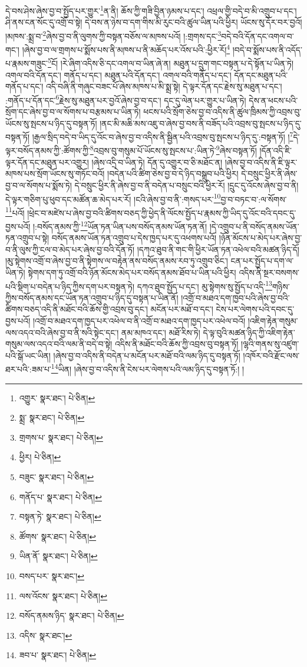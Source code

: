 དེ་བས་ཤེས་ཞེས་བྱ་བ་སྤྱོད་པར་གྱུར་\footnote{འགྱུར་  སྣར་ཐང་།  པེ་ཅིན། }ན་ནི། ཆོས་ཀྱི་གཟི་བྱིན་ཉམས་པ་དང་། འཕྲལ་གྱི་བདེ་བ་མི་འགྲུབ་པ་དང་། ཤི་ནས་ངན་སོང་དུ་འགྲོ་བ་སྟེ། དེ་བས་ན་ཉེས་བ་དག་གིས་མི་རུང་བའི་ཚུལ་ཡིན་པའི་ཕྱིར། ཡོངས་སུ་དོར་བར་བྱའོ། །མཁས་:སྨྲ་བ་\footnote{སྨྲ་  སྣར་ཐང་།  པེ་ཅིན། }ཞེས་བྱ་བ་ནི་ལུགས་ཀྱི་བསྟན་བཅོས་ལ་མཁས་པའོ། །:གྲགས་དང་\footnote{གྲགས་པ་  སྣར་ཐང་།  པེ་ཅིན། }བདེ་བའི་དོན་དང་འགལ་བ་གང་། །ཞེས་བྱ་བ་ལ་གྲགས་པ་སྨོས་པས་ནི་མཁས་པ་ནི་མཆོད་པར་འོས་པའི་:ཕྱིར་རོ།\footnote{ཕྱིར།  པེ་ཅིན། } །བདེ་བ་སྨོས་པས་ནི་འདོད་པ་རྣམས་གཟུང་\footnote{བཟུང་  སྣར་ཐང་།  པེ་ཅིན། }ངོ། །རེ་ཞིག་འདིས་ཅི་དང་འགལ་བ་ཡིན་ཞེ་ན། མཐུན་པ་དྲུག་གང་བསྟན་པ་དེ་སྟོན་པ་ཡིན་ཏེ། འགལ་བའི་དོན་དང་། གནོད་པ་དང་། མཐུན་པའི་དོན་དང་། འགལ་བའི་གནོད་པ་དང་། དོན་དང་མཐུན་པའི་གནོད་པ་དང་། འདི་བཞི་ནི་གཞུང་བཟང་པོ་ཞེས་མཁས་པ་མི་སྨྲ་སྟེ། དེ་ལྟར་དོན་དང་རྗེས་སུ་མཐུན་པ་དང་། :གནོད་པ་དོན་དང་\footnote{གནོད་པ་  སྣར་ཐང་།  པེ་ཅིན། }རྗེས་སུ་མཐུན་པར་བྱའོ་ཞེས་བྱ་བ་དང་། དང་དུ་ལེན་པར་གྱུར་པ་ཡིན་ཏེ། དེས་ན་ཕངས་པའི་སྲོག་དང་ཞེས་བྱ་བ་ལ་སོགས་པ་བརྩམས་པ་ཡིན་ཏེ། ཕངས་པའི་སྲོག་ཅེས་བྱ་བ་འདིས་ནི་ཚུལ་ཁྲིམས་ཀྱི་འབྲས་བུ་ཡོངས་སུ་སྤངས་པ་ཉིད་དུ་བསྟན་ཏོ། །ནང་མི་མཆི་མས་འཇུ་བ་ཞེས་བྱ་བས་ནི་བཟོད་པའི་འབྲས་བུ་སྤངས་པ་ཉིད་དུ་བསྟན་ཏོ། །རྒྱལ་སྲིད་བདེ་བ་ཡིད་དུ་འོང་བ་ཞེས་བྱ་བ་འདིས་ནི་སྦྱིན་པའི་འབྲས་བུ་སྤངས་པ་ཉིད་དུ་:བསྟན་ཏོ། །\footnote{བསྟན་ཏེ་  སྣར་ཐང་།  པེ་ཅིན། }དེ་ལྟར་བསོད་ནམས་ཀྱི་:ཚོགས་ཀྱི་\footnote{ཚོགས་  སྣར་ཐང་།  པེ་ཅིན། }འབྲས་བུ་གསུམ་པོ་ཡོངས་སུ་སྤངས་པ་:ཡིན་ཏེ་\footnote{ཡིན་ནོ་  སྣར་ཐང་།  པེ་ཅིན། }ཞེས་བསྟན་ཏོ། །དོན་འདི་ཇི་ལྟར་དོན་དང་མཐུན་པར་འགྱུར། །ཞེས་འདྲི་བ་ཡིན་ཏེ། དོན་དུ་འགྱུར་བ་ཅི་མཐོང་ན། །ཞེས་བྱ་བ་འདིས་ནི་ཇི་ལྟར་མཁས་པས་སྲོག་ཡོངས་སུ་གཏོང་བའོ། །བདེན་པའི་ཚིག་ཅེས་བྱ་བ་དེ་ཉིད་བསྒྲུབ་པའི་ཕྱིར། དེ་བསྲུང་ཕྱིར་ནི་ཞེས་བྱ་བ་ལ་སོགས་པ་སྨོས་ཏེ། དེ་བསྲུང་ཕྱིར་ནི་ཞེས་བྱ་བ་ནི་བདེན་པ་བསྲུང་བའི་ཕྱིར་རོ། །དྲུང་དུ་འོངས་ཞེས་བྱ་བ་ནི། དེ་ལྟར་གཅིག་པུ་ཕུབ་དང་མཚོན་ཆ་མེད་པར་རོ། །ངའི་ཞེས་བྱ་བ་ནི་:གསད་པར་\footnote{བསད་པར་  སྣར་ཐང་། }བྱ་བ་བཏང་བ་:ལ་སོགས་\footnote{ལས་འོངས་  སྣར་ཐང་།  པེ་ཅིན། }པའོ། །ཕྲེང་བ་མཛེས་པ་ཞེས་བྱ་བའི་ཚིགས་བཅད་ཀྱི་ཕྱེད་ནི་ལོངས་སྤྱོད་པ་རྣམས་ཀྱི་ཡིད་དུ་འོང་བའི་དབང་དུ་བྱས་པའོ། །:བསོད་ནམས་ཀྱི་\footnote{བསོད་ནམས་ཉིད་  སྣར་ཐང་།  པེ་ཅིན། }ཡོན་ཏན་ཡིན་པས་བསོད་ནམས་ཡོན་ཏན་ནོ། །དེ་འགྲུབ་པ་ནི་བསོད་ནམས་ཡོན་ཏན་འགྲུབ་པ་སྟེ། བསོད་ནམས་ཡོན་ཏན་འགྲུབ་པ་དེས་ཁྱད་པར་དུ་འཕགས་པའོ། །ཉོན་མོངས་པ་མེད་པར་ཞེས་བྱ་བ་ནི་ལུས་ཀྱི་ངལ་བ་མེད་པར་ཞེས་བྱ་བའི་དོན་ཏོ། །དཀའ་ཐུབ་ནི་གང་གི་ཕྱིར་ཡོན་ཏན་འཕེལ་བའི་མཚན་ཉིད་དོ། །མུ་སྟེགས་འགྲོ་བ་ཞེས་བྱ་བ་ནི་སྟེགས་ལ་བརྟེན་ནས་བསོད་ནམས་རབ་ཏུ་འགྲུབ་ཅིང་། ངན་པར་སྤྱོད་པ་དག་ལ་ཡིན་ཏེ། སྟེགས་དག་ཏུ་འགྲོ་བའི་ཉོན་མོངས་མེད་པར་བསོད་ནམས་ཐོབ་པ་ཡིན་པའི་ཕྱིར། འདིས་ནི་སྔར་བསགས་པའི་སྡིག་པ་བདེན་པ་ཉིད་ཀྱིས་དག་པར་བསྟན་ཏེ། དཀའ་ཐུབ་སྤྱོད་པ་དང་། མུ་སྟེགས་སུ་སྤྱོད་པ་འདི་\footnote{འདིས་  སྣར་ཐང་། }གཉིས་ཀྱིས་བསོད་ནམས་དང་ཡོན་ཏན་འགྲུབ་པ་ཉིད་དུ་བསྟན་པ་ཡིན་ནོ། །འགྲོ་བ་མཐའ་དག་ཁྱབ་པའི་ཞེས་བྱ་བའི་ཚིགས་བཅད་འདི་ནི་མཐོང་བའི་ཆོས་གྱི་འབྲས་བུ་དང་། མངོན་པར་མཐོ་བ་དང་། ངེས་པར་ལེགས་པའི་དབང་དུ་བྱས་པའོ། །འགྲོ་བ་མཐའ་དག་ཁྱད་པར་འཕེལ་བ་ནི་འགྲོ་བ་མཐའ་དག་ཁྱད་པར་འཕེལ་བའོ། །འཇིག་རྟེན་གསུམ་ལས་འདའ་བའི་ཞེས་བྱ་བ་ནི་སའི་སྟེང་དང་། ནམ་མཁའ་དང་། མཐོ་རིས་ཏེ། དེ་ལྟ་བུའི་མཚན་ཉིད་ཀྱི་འཇིག་རྟེན་གསུམ་ལས་འདའ་བའི་ལམ་ནི་བདེ་བ་སྟེ། འདིས་ནི་མཐོང་བའི་ཆོས་ཀྱི་འབྲས་བུ་བསྟན་ཏོ། །ལྷའི་གནས་སུ་འཛུག་པའི་སྒོ་ཡང་ཡིན། །ཞེས་བྱ་བ་འདིས་ནི་བདེན་པ་མངོན་པར་མཐོ་བའི་ལམ་ཉིད་དུ་བསྟན་ཏོ། །འཁོར་བའི་རྫོང་ལས་ཐར་པའི་:ཟམ་པ་\footnote{ཟབ་པ་  སྣར་ཐང་།  པེ་ཅིན། }ཡིན། །ཞེས་བྱ་བ་འདིས་ནི་ངེས་པར་ལེགས་པའི་ལམ་ཉིད་དུ་བསྟན་ཏོ:། །
